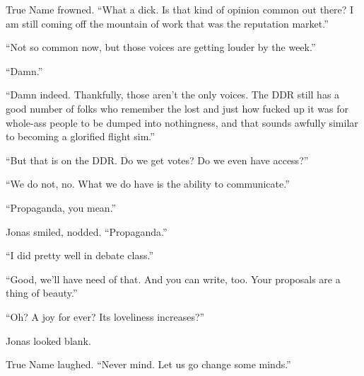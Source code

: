 True Name frowned. ``What a dick. Is that kind of opinion common out there? I am still coming off the mountain of work that was the reputation market.''

``Not so common now, but those voices are getting louder by the week.''

``Damn.''

``Damn indeed. Thankfully, those aren't the only voices. The DDR still has a good number of folks who remember the lost and just how fucked up it was for whole-ass people to be dumped into nothingness, and that sounds awfully similar to becoming a glorified flight sim.''

``But that is on the DDR. Do we get votes? Do we even have access?''

``We do not, no. What we do have is the ability to communicate.''

``Propaganda, you mean.''

Jonas smiled, nodded. ``Propaganda.''

``I did pretty well in debate class.''

``Good, we'll have need of that. And you can write, too. Your proposals are a thing of beauty.''

``Oh? A joy for ever? Its loveliness increases?''

Jonas looked blank.

True Name laughed. ``Never mind. Let us go change some minds.''
